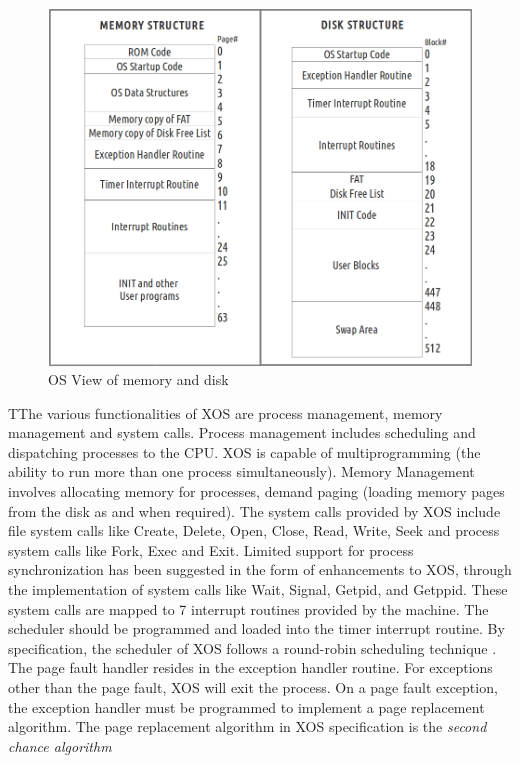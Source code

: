 \documentclass[10pt]{report}
\begin{document}
\begin{figure}[hbtp]
\centering
\includegraphics[scale=0.4]{memdiskstructure.png}
\caption{OS View of memory and disk}
\end{figure}

TThe various functionalities of XOS are process management, memory management and system calls. Process management includes scheduling and dispatching processes to the CPU. XOS is capable of multiprogramming (the ability to run more than one process simultaneously). Memory Management involves allocating memory for processes, demand paging (loading memory pages from the disk as and when required). The system calls provided by XOS include file system calls like Create, Delete, Open, Close, Read, Write, Seek and process system calls like Fork, Exec and Exit. Limited support for process synchronization has been suggested in the form of enhancements to XOS, through the implementation of system calls like Wait, Signal, Getpid, and Getppid. These system calls are mapped to 7 interrupt routines provided by the machine. The scheduler should be programmed and loaded into the timer interrupt routine. By specification, the scheduler of XOS follows a round-robin scheduling technique \cite{silberschatz}. The page fault handler resides in the exception handler routine. For exceptions other than the page fault, XOS will exit the process. On a page fault exception, the exception handler must be programmed to implement a page replacement algorithm. The page replacement algorithm in XOS specification is the \textit{second chance algorithm}\cite{silberschatz} \\
\end{document}

